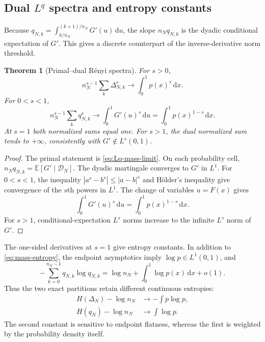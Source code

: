 \documentclass[11pt,oneside]{article}
\newtheorem{theorem}{Theorem}[section]
\theoremstyle{definition}
\theoremstyle{remark}
\newcommand{\E}{\mathbb E}
\newcommand{\dd}{\,\mathrm d}
\begin{document}
\subsection{Dual $L^q$ spectra and entropy constants}

Because $q_{N,k}=\int_{k/n_N}^{(k+1)/n_N}G'(u)\dd u$, the slope
$n_Nq_{N,k}$ is the dyadic conditional expectation of $G'$.  This gives a
discrete counterpart of the inverse-derivative norm threshold.

\begin{theorem}[Primal--dual R\'enyi spectra]
\label{thm:dual-Renyi}
For $s>0$,
\begin{equation}\label{eq:primal-Renyi}
 n_N^{s-1}\sum_k\Delta_{N,k}^s
 \longrightarrow\int_0^1p(x)^s\dd x.
\end{equation}
For $0<s<1$,
\begin{equation}\label{eq:dual-Renyi}
 n_N^{s-1}\sum_kq_{N,k}^s
 \longrightarrow\int_0^1G'(u)^s\dd u
 =\int_0^1p(x)^{1-s}\dd x.
\end{equation}
At $s=1$ both normalized sums equal one.  For $s>1$, the dual normalized
sum tends to $+\infty$, consistently with $G'\notin L^s(0,1)$.
\end{theorem}

\begin{proof}
The primal statement is \eqref{eq:Lq-mass-limit}.  On each probability cell,
$n_Nq_{N,k}=\E[G'\mid\mathcal D_N]$.  The dyadic martingale converges to $G'$
in $L^1$.  For $0<s<1$, the inequality
$|a^s-b^s|\le|a-b|^s$ and H\"older's inequality give convergence of the
$s$th powers in $L^1$.  The change of variables $u=F(x)$ gives
\[
 \int_0^1G'(u)^s\dd u
 =\int_0^1p(x)^{1-s}\dd x.
\]
For $s>1$, conditional-expectation $L^s$ norms increase to the infinite
$L^s$ norm of $G'$.
\end{proof}

The one-sided derivatives at $s=1$ give entropy constants.  In addition to
\eqref{eq:mass-entropy}, the endpoint asymptotics imply $\log p\in L^1(0,1)$,
and
\begin{equation}\label{eq:quantile-entropy}
 -\sum_{k=0}^{n_N-1}q_{N,k}\log q_{N,k}
 =\log n_N+\int_0^1\log p(x)\dd x+o(1).
\end{equation}
Thus the two exact partitions retain different continuous entropies:
\begin{align}
 H(\Delta_N)-\log n_N&\longrightarrow-\int p\log p,
 \label{eq:entropy-primal-constant}\\
 H(q_N)-\log n_N&\longrightarrow\int\log p.
 \label{eq:entropy-dual-constant}
\end{align}
The second constant is sensitive to endpoint flatness, whereas the first is
weighted by the probability density itself.
\end{document}
